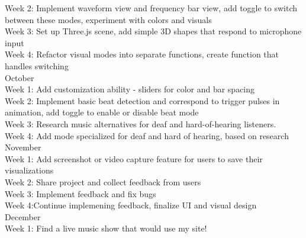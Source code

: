 \documentclass[10pt,twocolumn]{article}
\begin{document}
    Week 2:
    Implement waveform view and frequency bar view, add toggle to switch between these modes, experiment with colors and visuals\\
    
    Week 3:
    Set up Three.js scene, add simple 3D shapes that respond to microphone input\\
    
    Week 4:
    Refactor visual modes into separate functions, create function that handles switching\\

October\\

    Week 1:
    Add customization ability - sliders for color and bar spacing\\
    
    Week 2:
    Implement basic beat detection and correspond to trigger pulses in animation, add toggle to enable or disable beat mode\\
    
    Week 3:
    Research music alternatives for deaf and hard-of-hearing listeners.\\
    
    Week 4:
    Add mode specialized for deaf and hard of hearing, based on research\\

November\\

    Week 1: 
    Add screenshot or video capture feature for users to save their visualizations\\
    
    Week 2:
    Share project and collect feedback from users\\
    
    Week 3:
    Implement feedback and fix bugs\\
    
    Week 4:Continue implemening feedback, finalize UI and visual design\\

December\\

    Week 1: Find a live music show that would use my site!\\
    
\appendix



\printbibliography
\end{document}
